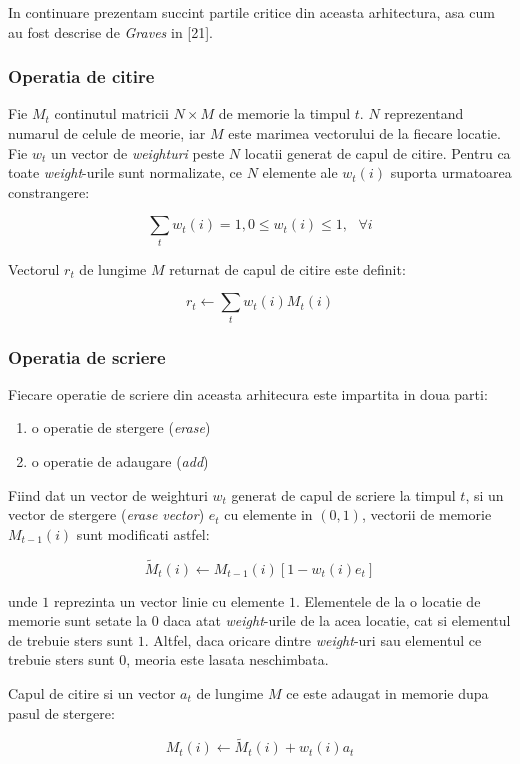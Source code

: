 \documentclass[12pt]{article}
\begin{document}
In continuare prezentam succint partile critice din aceasta arhitectura, asa cum au fost descrise de \textit{Graves} in [21].

\subsubsection{Operatia de citire}
Fie $M_t$ continutul matricii $N \times M$ de memorie la timpul $t$. $N$ reprezentand numarul de celule de meorie, iar $M$ este marimea vectorului de la fiecare locatie. Fie $w_t$ un vector de \textit{weighturi} peste $N$ locatii generat de capul de citire. Pentru ca toate \textit{weight}-urile sunt normalizate, ce $N$ elemente ale $w_t(i)$ suporta urmatoarea constrangere:

$$\sum_t w_t(i)= 1, 0 \leq w_t(i) \leq 1,\ \ \ \forall i $$

Vectorul $r_t$ de lungime $M$ returnat de capul de citire este definit:

$$r_t \leftarrow \sum_{t} w_t(i)M_t(i) $$
\subsubsection{Operatia de scriere}
Fiecare operatie de scriere din aceasta arhitecura este impartita in doua parti:
\begin{enumerate}
	\item o operatie de stergere (\textit{erase})
	\item o operatie de adaugare (\textit{add})
\end{enumerate}

Fiind dat un vector de weighturi $w_t$ generat de capul de scriere la timpul $t$, si un vector de stergere (\textit{erase vector}) $e_t$ cu elemente in $(0, 1)$, vectorii de memorie $M_{t-1}(i)$ sunt modificati astfel:

$$ \tilde{M}_t(i) \leftarrow M_{t-1}(i)[1 - w_t(i)e_t] $$

unde $1$ reprezinta un vector linie cu elemente $1$. Elementele de la o locatie de memorie sunt setate la $0$ daca atat \textit{weight}-urile de la acea locatie, cat si elementul de trebuie sters sunt $1$. Altfel, daca oricare dintre \textit{weight}-uri sau elementul ce trebuie sters sunt $0$, meoria este lasata neschimbata. 

Capul de citire si un vector $a_t$ de lungime $M$ ce este adaugat in memorie dupa pasul de stergere:

$$ M_t(i) \leftarrow \tilde{M}_t(i) + w_t(i)a_t $$
\end{document}
